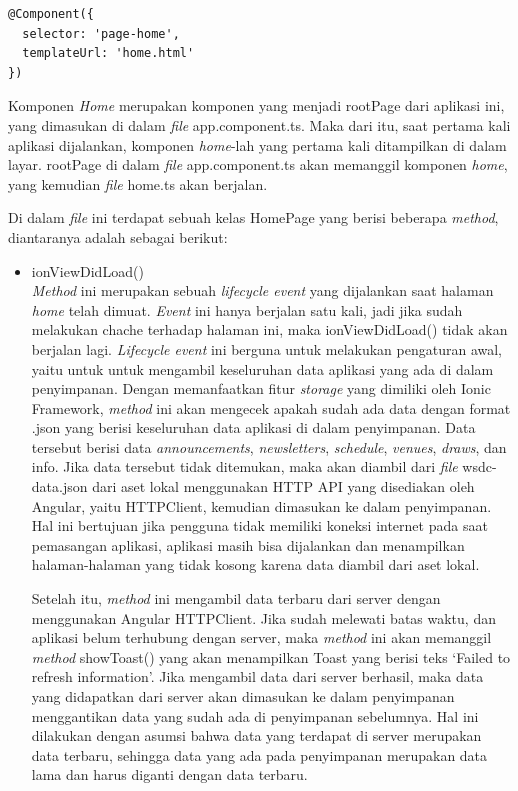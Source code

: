 \begin{enumerate}
\begin{enumerate}
\begin{lstlisting}[label={lst:componenthome}, caption=@Component pada home.ts]
@Component({
  selector: 'page-home',
  templateUrl: 'home.html'
})
\end{lstlisting}	
	\newpage
	Komponen \textit{Home} merupakan komponen yang menjadi rootPage dari aplikasi ini, yang dimasukan di dalam \textit{file} app.component.ts. Maka dari itu, saat pertama kali aplikasi dijalankan, komponen \textit{home}-lah yang pertama kali ditampilkan di dalam layar. rootPage di dalam \textit{file} app.component.ts akan memanggil komponen \textit{home}, yang kemudian \textit{file} home.ts akan berjalan. 
	
	Di dalam \textit{file} ini terdapat sebuah kelas HomePage yang berisi beberapa \textit{method}, diantaranya adalah sebagai berikut:
	
	\begin{itemize}
		\item ionViewDidLoad() \\
		\textit{Method} ini merupakan sebuah \textit{lifecycle event} yang dijalankan saat halaman \textit{home} telah dimuat. \textit{Event} ini hanya berjalan satu kali, jadi jika sudah melakukan chache terhadap halaman ini, maka ionViewDidLoad() tidak akan berjalan lagi. \textit{Lifecycle event} ini berguna untuk melakukan pengaturan awal, yaitu untuk untuk mengambil keseluruhan data aplikasi yang ada di dalam penyimpanan. Dengan memanfaatkan fitur \textit{storage} yang dimiliki oleh Ionic Framework, \textit{method} ini akan mengecek apakah sudah ada data dengan format .json yang berisi keseluruhan data aplikasi di dalam penyimpanan. Data tersebut berisi data \textit{announcements}, \textit{newsletters}, \textit{schedule}, \textit{venues}, \textit{draws}, dan info. Jika data tersebut tidak ditemukan, maka akan diambil dari \textit{file} wsdc-data.json dari aset lokal menggunakan HTTP API yang disediakan oleh Angular, yaitu HTTPClient, kemudian dimasukan ke dalam penyimpanan. Hal ini bertujuan jika pengguna tidak memiliki koneksi internet pada saat pemasangan aplikasi, aplikasi masih bisa dijalankan dan menampilkan halaman-halaman yang tidak kosong karena data diambil dari aset lokal.
		
		Setelah itu, \textit{method} ini mengambil data terbaru dari server dengan menggunakan Angular HTTPClient. Jika sudah melewati batas waktu, dan aplikasi belum terhubung dengan server, maka \textit{method} ini akan memanggil \textit{method} showToast() yang akan menampilkan Toast yang berisi teks `Failed to refresh information'. Jika mengambil data dari server berhasil, maka data yang didapatkan dari server akan dimasukan ke dalam penyimpanan menggantikan data yang sudah ada di penyimpanan sebelumnya. Hal ini dilakukan dengan asumsi bahwa data yang terdapat di server merupakan data terbaru, sehingga data yang ada pada penyimpanan merupakan data lama dan harus diganti dengan data terbaru.
	

\end{itemize}
\end{enumerate}
\end{enumerate}
